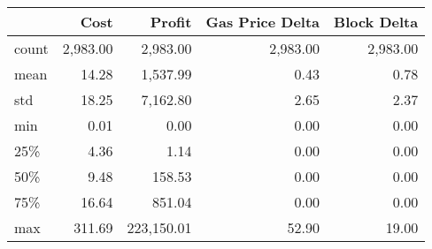 \begin{tabular}{lrrrr}
\toprule
{} &     Cost &     Profit & Gas Price Delta & Block Delta \\
\midrule
count & 2,983.00 &   2,983.00 &        2,983.00 &    2,983.00 \\
mean  &    14.28 &   1,537.99 &            0.43 &        0.78 \\
std   &    18.25 &   7,162.80 &            2.65 &        2.37 \\
min   &     0.01 &       0.00 &            0.00 &        0.00 \\
25\%   &     4.36 &       1.14 &            0.00 &        0.00 \\
50\%   &     9.48 &     158.53 &            0.00 &        0.00 \\
75\%   &    16.64 &     851.04 &            0.00 &        0.00 \\
max   &   311.69 & 223,150.01 &           52.90 &       19.00 \\
\bottomrule
\end{tabular}
